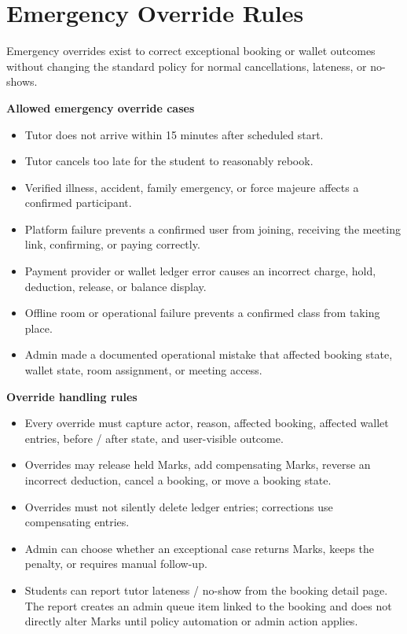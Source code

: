 \documentclass[11pt,a4paper]{article}
\begin{document}
\section{Emergency Override Rules}

Emergency overrides exist to correct exceptional booking or wallet outcomes without changing the standard policy for normal cancellations, lateness, or no-shows.

\textbf{Allowed emergency override cases}
\begin{itemize}
    \item Tutor does not arrive within 15 minutes after scheduled start.
    \item Tutor cancels too late for the student to reasonably rebook.
    \item Verified illness, accident, family emergency, or force majeure affects a confirmed participant.
    \item Platform failure prevents a confirmed user from joining, receiving the meeting link, confirming, or paying correctly.
    \item Payment provider or wallet ledger error causes an incorrect charge, hold, deduction, release, or balance display.
    \item Offline room or operational failure prevents a confirmed class from taking place.
    \item Admin made a documented operational mistake that affected booking state, wallet state, room assignment, or meeting access.
\end{itemize}

\textbf{Override handling rules}
\begin{itemize}
    \item Every override must capture actor, reason, affected booking, affected wallet entries, before / after state, and user-visible outcome.
    \item Overrides may release held Marks, add compensating Marks, reverse an incorrect deduction, cancel a booking, or move a booking state.
    \item Overrides must not silently delete ledger entries; corrections use compensating entries.
    \item Admin can choose whether an exceptional case returns Marks, keeps the penalty, or requires manual follow-up.
    \item Students can report tutor lateness / no-show from the booking detail page. The report creates an admin queue item linked to the booking and does not directly alter Marks until policy automation or admin action applies.
\end{itemize}
\end{document}
